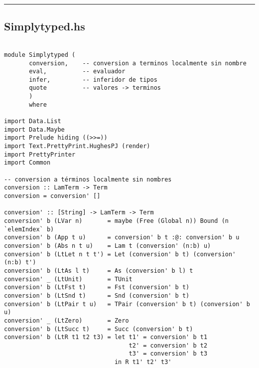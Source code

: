 \documentclass[a4paper]{article}
\begin{document}
\bigskip
\bigskip
\bigskip
\noindent\rule{16cm}{0.4pt}
\subsection*{Simplytyped.hs}
\begin{lstlisting}

module Simplytyped (
       conversion,    -- conversion a terminos localmente sin nombre
       eval,          -- evaluador
       infer,         -- inferidor de tipos
       quote          -- valores -> terminos
       )
       where

import Data.List
import Data.Maybe
import Prelude hiding ((>>=))
import Text.PrettyPrint.HughesPJ (render)
import PrettyPrinter
import Common

-- conversion a términos localmente sin nombres
conversion :: LamTerm -> Term
conversion = conversion' []

conversion' :: [String] -> LamTerm -> Term
conversion' b (LVar n)       = maybe (Free (Global n)) Bound (n `elemIndex` b)
conversion' b (App t u)      = conversion' b t :@: conversion' b u
conversion' b (Abs n t u)    = Lam t (conversion' (n:b) u)
conversion' b (LtLet n t t') = Let (conversion' b t) (conversion' (n:b) t')
conversion' b (LtAs l t)     = As (conversion' b l) t
conversion' _ (LtUnit)       = TUnit
conversion' b (LtFst t)      = Fst (conversion' b t)
conversion' b (LtSnd t)      = Snd (conversion' b t)
conversion' b (LtPair t u)   = TPair (conversion' b t) (conversion' b u)
conversion' _ (LtZero)       = Zero
conversion' b (LtSucc t)     = Succ (conversion' b t)
conversion' b (LtR t1 t2 t3) = let t1' = conversion' b t1
                                   t2' = conversion' b t2
                                   t3' = conversion' b t3
                               in R t1' t2' t3'

\end{lstlisting}
\pagebreak
\end{document}
